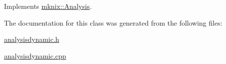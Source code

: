 Implements \hyperlink{classmknix_1_1_analysis_a6dd7026a22ae11f3eef3dad3be370e70}{mknix\-::\-Analysis}.



The documentation for this class was generated from the following files\-:\begin{DoxyCompactItemize}
\item 
\hyperlink{analysisdynamic_8h}{analysisdynamic.\-h}\item 
\hyperlink{analysisdynamic_8cpp}{analysisdynamic.\-cpp}\end{DoxyCompactItemize}
